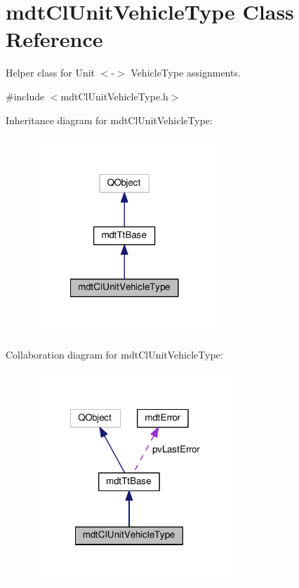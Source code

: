 \hypertarget{classmdt_cl_unit_vehicle_type}{\section{mdt\-Cl\-Unit\-Vehicle\-Type Class Reference}
\label{classmdt_cl_unit_vehicle_type}
}


Helper class for Unit $<$-\/$>$ Vehicle\-Type assignments.  




{\ttfamily \#include $<$mdt\-Cl\-Unit\-Vehicle\-Type.\-h$>$}



Inheritance diagram for mdt\-Cl\-Unit\-Vehicle\-Type\-:\nopagebreak
\begin{figure}[H]
\begin{center}
\leavevmode
\includegraphics[width=194pt]{classmdt_cl_unit_vehicle_type__inherit__graph}
\end{center}
\end{figure}


Collaboration diagram for mdt\-Cl\-Unit\-Vehicle\-Type\-:\nopagebreak
\begin{figure}[H]
\begin{center}
\leavevmode
\includegraphics[width=218pt]{classmdt_cl_unit_vehicle_type__coll__graph}
\end{center}
\end{figure}
